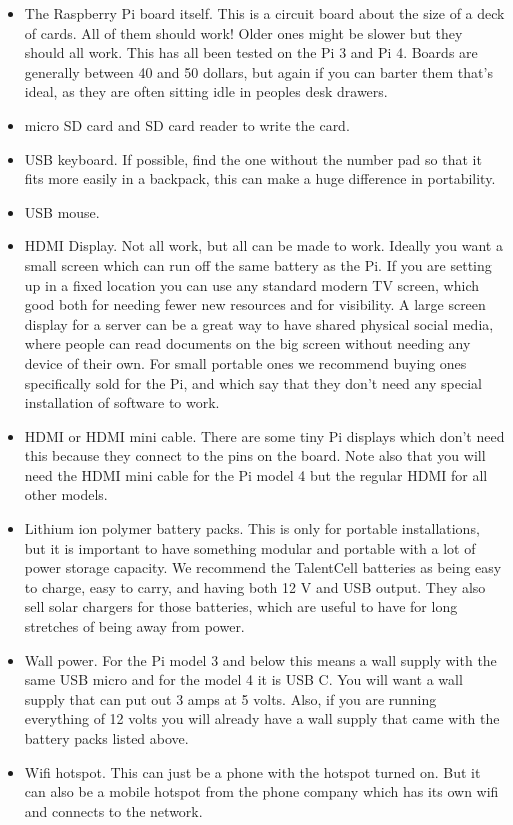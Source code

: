 \begin{itemize}

\item The Raspberry Pi board itself.  This is a circuit board about the size of a deck of cards.  All of them should work! Older ones might be slower but they should all work.  This has all been tested on the Pi 3 and Pi 4.  Boards are generally between 40 and 50 dollars, but again if you can barter them that's ideal, as they are often sitting idle in peoples desk drawers.
\item micro SD card and SD card reader to write the card.  
\item USB keyboard.  If possible, find the one without the number pad so that it fits more easily in a backpack, this can make a huge difference in portability.
\item USB mouse.
\item HDMI Display. Not all work, but all can be made to work. Ideally you want a small screen which can run off the same battery as the Pi.  If you are setting up in a fixed location you can use any standard modern TV screen, which good both for needing fewer new resources and for visibility.  A large screen display for a server can be a great way to have shared physical social media, where people can read documents on the big screen without needing any device of their own.  For small portable ones we recommend buying ones specifically sold for the Pi, and which say that they don't need any special installation of software to work.
\item HDMI or HDMI mini cable.  There are some tiny Pi displays which don't need this because they connect to the pins on the board.  Note also that you will need the HDMI mini cable for the Pi model 4 but the regular HDMI for all other models.
\item Lithium ion polymer battery packs. This is only for portable installations, but it is important to have something modular and portable with a lot of power storage capacity.  We recommend the TalentCell batteries as being easy to charge, easy to carry, and having both 12 V and USB output.  They also sell solar chargers for those batteries, which are useful to have for long stretches of being away from power.
\item Wall power.  For the Pi model 3 and below this means a wall supply with the same USB micro and for the model 4 it is USB C.  You will want a wall supply that can put out 3 amps at 5 volts.  Also, if you are running everything of 12 volts you will already have a wall supply that came with the battery packs listed above.
\item Wifi hotspot.  This can just be a phone with the hotspot turned on.  But it can also be a mobile hotspot from the phone company which has its own wifi and connects to the network.

\end{itemize}
 
